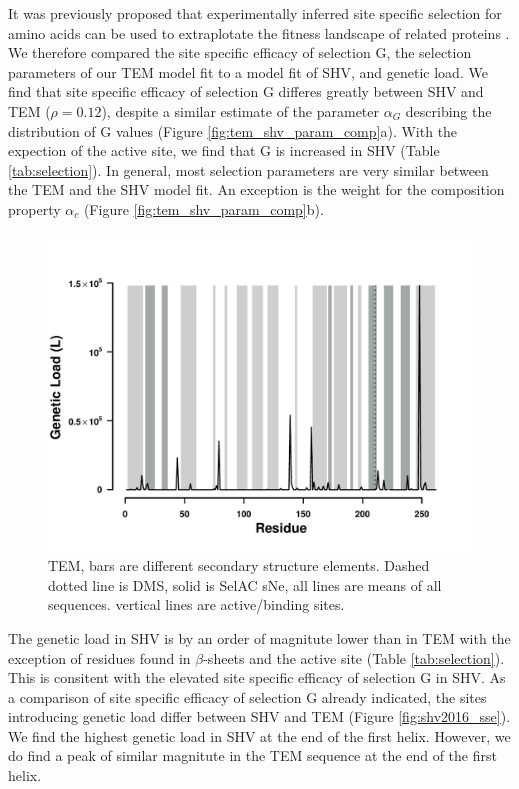 \documentclass[12pt]{article}
\begin{document}
It was previously proposed that experimentally inferred site specific selection for amino acids can be used to extraplotate the fitness landscape of related proteins \citep{bloom2014}.
We therefore compared the site specific efficacy of selection G, the \selac selection parameters of our \selac TEM model fit to a \selac model fit of SHV, and genetic load.
We find that site specific efficacy of selection G differes greatly between SHV and TEM ($\rho = 0.12$), despite a similar estimate of the parameter $\alpha_G$ describing the distribution of G values (Figure \ref{fig:tem_shv_param_comp}a).
With the expection of the active site, we find that G is increased in SHV (Table \ref{tab:selection}).
In general, most \selac selection parameters are very similar between the TEM and the SHV model fit. 
An exception is the weight for the \PC composition property $\alpha_c$ (Figure \ref{fig:tem_shv_param_comp}b).

\begin{figure}[H]
     \centering
	\includegraphics[width=\textwidth]{img/GL_slide_TEM2016}
	\caption{TEM, bars are different secondary structure elements. Dashed dotted line is DMS, solid is SelAC sNe, all lines are means of all sequences. vertical lines are active/binding sites.}
	\label{fig:tem2016_sse}
\end{figure}

The genetic load in SHV is by an order of magnitute lower than in TEM with the exception of residues found in $\beta$-sheets and the active site (Table \ref{tab:selection}).
This is consitent with the elevated site specific efficacy of selection G in SHV.
As a comparison of site specific efficacy of selection G already indicated, the sites introducing genetic load differ between SHV and TEM (Figure \ref{fig:shv2016_sse}).
We find the highest genetic load in SHV at the end of the first helix.
However, we do find a peak of similar magnitute in the TEM sequence at the end of the first helix.
\end{document}
